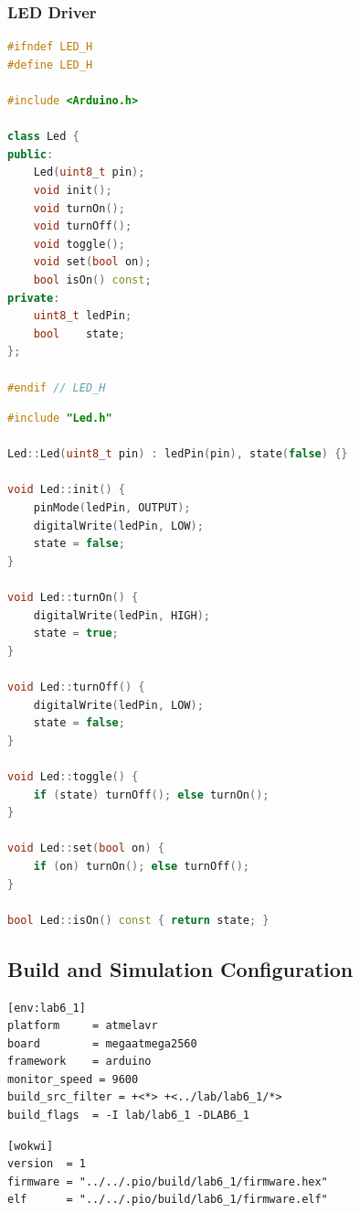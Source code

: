 \subsubsection{LED Driver}

\begin{lstlisting}[language=C++, caption=lib/Led/Led.h --- LED driver interface, label=lst:appendix_led_h]
#ifndef LED_H
#define LED_H

#include <Arduino.h>

class Led {
public:
    Led(uint8_t pin);
    void init();
    void turnOn();
    void turnOff();
    void toggle();
    void set(bool on);
    bool isOn() const;
private:
    uint8_t ledPin;
    bool    state;
};

#endif // LED_H
\end{lstlisting}

\begin{lstlisting}[language=C++, caption=lib/Led/Led.cpp --- LED driver implementation, label=lst:appendix_led_cpp]
#include "Led.h"

Led::Led(uint8_t pin) : ledPin(pin), state(false) {}

void Led::init() {
    pinMode(ledPin, OUTPUT);
    digitalWrite(ledPin, LOW);
    state = false;
}

void Led::turnOn() {
    digitalWrite(ledPin, HIGH);
    state = true;
}

void Led::turnOff() {
    digitalWrite(ledPin, LOW);
    state = false;
}

void Led::toggle() {
    if (state) turnOff(); else turnOn();
}

void Led::set(bool on) {
    if (on) turnOn(); else turnOff();
}

bool Led::isOn() const { return state; }
\end{lstlisting}

\subsection{Build and Simulation Configuration}

\begin{lstlisting}[caption=labs/platformio.ini --- Lab 6.1 environment, label=lst:appendix_pio_ini]
[env:lab6_1]
platform     = atmelavr
board        = megaatmega2560
framework    = arduino
monitor_speed = 9600
build_src_filter = +<*> +<../lab/lab6_1/*>
build_flags  = -I lab/lab6_1 -DLAB6_1
\end{lstlisting}

\begin{lstlisting}[caption=labs/wokwi/lab6.1/wokwi.toml --- simulator firmware path, label=lst:appendix_wokwi_toml]
[wokwi]
version  = 1
firmware = "../../.pio/build/lab6_1/firmware.hex"
elf      = "../../.pio/build/lab6_1/firmware.elf"
\end{lstlisting}

